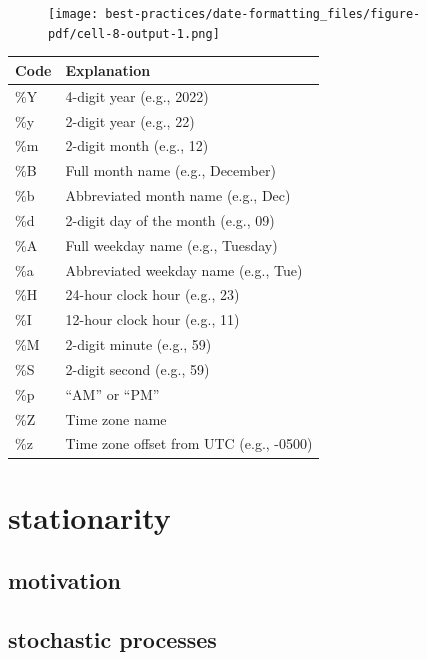 \documentclass[
  letterpaper,
  DIV=11,
  numbers=noendperiod,
  oneside]{scrreprt}
\begin{document}
\begin{figure}[H]

{\centering \texttt{[image: best-practices/date-formatting\_files/figure-pdf/cell-8-output-1.png]}

}

\end{figure}

\begin{longtable}[]{@{}ll@{}}
\toprule\noalign{}
Code & Explanation \\
\midrule\noalign{}
\endhead
\bottomrule\noalign{}
\endlastfoot
\%Y & 4-digit year (e.g., 2022) \\
\%y & 2-digit year (e.g., 22) \\
\%m & 2-digit month (e.g., 12) \\
\%B & Full month name (e.g., December) \\
\%b & Abbreviated month name (e.g., Dec) \\
\%d & 2-digit day of the month (e.g., 09) \\
\%A & Full weekday name (e.g., Tuesday) \\
\%a & Abbreviated weekday name (e.g., Tue) \\
\%H & 24-hour clock hour (e.g., 23) \\
\%I & 12-hour clock hour (e.g., 11) \\
\%M & 2-digit minute (e.g., 59) \\
\%S & 2-digit second (e.g., 59) \\
\%p & ``AM'' or ``PM'' \\
\%Z & Time zone name \\
\%z & Time zone offset from UTC (e.g., -0500) \\
\end{longtable}

\part{stationarity}

\hypertarget{motivation-4}{%
\chapter{motivation}\label{motivation-4}}

\hypertarget{stochastic-processes}{%
\chapter{stochastic processes}\label{stochastic-processes}}
\end{document}
